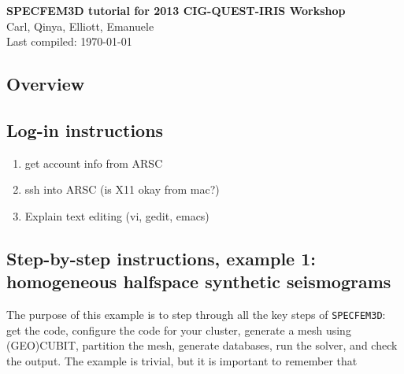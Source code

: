 \documentclass[10pt,titlepage,fleqn]{article}
\begin{document}

\noindent
{\bf SPECFEM3D tutorial for 2013 CIG-QUEST-IRIS Workshop} \\
\noindent Carl, Qinya, Elliott, Emanuele  \\
\noindent Last compiled: \today \\



\subsection*{Overview}


\subsection*{Log-in instructions}

\begin{enumerate}
\item get account info from ARSC
\item ssh into ARSC (is X11 okay from mac?)
\item Explain text editing (vi, gedit, emacs)
\end{enumerate}


\subsection*{Step-by-step instructions, example 1: homogeneous halfspace synthetic seismograms}

The purpose of this example is to step through all the key steps of \verb+SPECFEM3D+: get the code, configure the code for your cluster, generate a mesh using (GEO)CUBIT, partition the mesh, generate databases, run the solver, and check the output. The example is trivial, but it is important to remember that 
\end{document}
